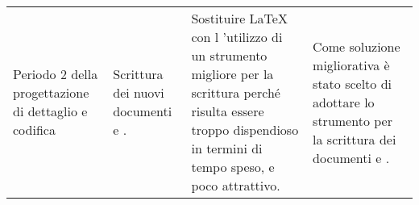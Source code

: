 {\begin{longtable}{ C{3cm} C{4cm} C{3cm} C{4cm}}
	Periodo 2 della progettazione di dettaglio e codifica & Scrittura dei nuovi documenti \MM e \MU. & Sostituire \LaTeX{} con l 'utilizzo di un strumento migliore per la scrittura perché risulta essere troppo dispendioso in termini di tempo speso, e poco attrattivo. & Come soluzione migliorativa è stato scelto di adottare lo strumento  per la scrittura dei documenti \MM e \MU.\\
	
	
\end{longtable}
}






